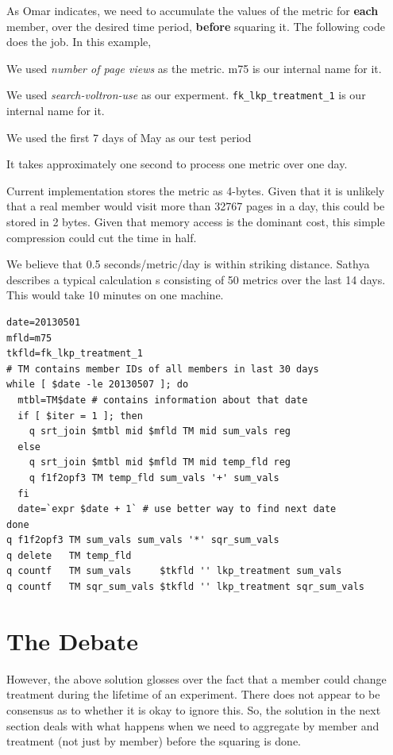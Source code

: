 As Omar indicates, we need to accumulate the values of the metric for
{\bf each} member, over the desired time period, {\bf before} squaring it. The
following code does the job.  In this example, 
\bi
\item We used {\it number of page views} as the metric. m75 is our internal
  name for it. 
\item We used {\it search-voltron-use} as our experment.
\verb+fk_lkp_treatment_1+ is our internal name for it.
\item We used the first 7 days of May as our test period
\item It takes approximately one second to process one metric over one
day.  
\item Current implementation stores the metric as 4-bytes. Given
that it is unlikely that a real member would visit more than 32767
pages in a day, this could be stored in 2 bytes. Given that memory
access is the dominant cost, this simple compression could cut the
time in half.
\item We believe that 0.5 seconds/metric/day is within striking
distance. Sathya describes a typical calculation s consisting of 50 
metrics over the last 14 days. This would take 10 minutes on one
machine.
\ei
\begin{verbatim}
date=20130501
mfld=m75
tkfld=fk_lkp_treatment_1
# TM contains member IDs of all members in last 30 days
while [ $date -le 20130507 ]; do
  mtbl=TM$date # contains information about that date
  if [ $iter = 1 ]; then
    q srt_join $mtbl mid $mfld TM mid sum_vals reg
  else
    q srt_join $mtbl mid $mfld TM mid temp_fld reg
    q f1f2opf3 TM temp_fld sum_vals '+' sum_vals
  fi
  date=`expr $date + 1` # use better way to find next date
done
q f1f2opf3 TM sum_vals sum_vals '*' sqr_sum_vals
q delete   TM temp_fld
q countf   TM sum_vals     $tkfld '' lkp_treatment sum_vals
q countf   TM sqr_sum_vals $tkfld '' lkp_treatment sqr_sum_vals
\end{verbatim}

\section{The Debate}
\label{The_Debate}

However, the above solution glosses over the fact that a member could
change treatment during the lifetime of an experiment. There does not
appear to be consensus as to whether it is okay to ignore this. So, the
solution in the next section deals with what happens when we need to
aggregate by member and treatment (not just by member) before the
squaring is done. 

